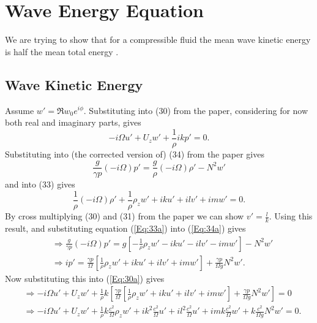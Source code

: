 \documentclass[12pt]{article}
\begin{document}
\section{Wave Energy Equation}
We are trying to show that for a compressible fluid the mean wave kinetic energy is half the mean total energy \citep[p. 476]{bretherton66}.

\subsection{Wave Kinetic Energy}

Assume $w' = \Re{w_0 e^{i\phi}}$. Substituting into (30) from the paper, considering for now both real and imaginary parts, gives
\begin{equation}
-i\Omega u' + U_z w' +\frac{1}{\rho} i k p' = 0. \label{Eq:30a}
\end{equation}
Substituting into (the corrected version of) (34) from the paper gives
\begin{equation} \frac{g}{\gamma p} (-i\Omega) p' = \frac{g}{\rho} (-i\Omega) \rho' - N^2 w' \label{Eq:34a}
\end{equation}
and into (33) gives
\begin{equation}
\frac{1}{\rho}(-i\Omega)\rho' + \frac{1}{\rho} \rho_z w' + iku'+ilv' + im w' = 0. \label{Eq:33a}
\end{equation}
By cross multiplying (30) and (31) from the paper we can show $v' = \frac{l}{k}$. Using this result, and substituting equation (\ref{Eq:33a}) into (\ref{Eq:34a}) gives
\begin{align} 
& \Rightarrow \frac{g}{\gamma p} (-i\Omega) p' = g\left[ -\frac{1}{\rho} \rho_z w' - iku' - ilv' - im w' \right] - N^2 w' \\
&\Rightarrow ip' = \frac{\gamma p}{\Omega} \left[ \frac{1}{\rho} \rho_z w' + iku' + ilv' + im w' \right] + \frac{\gamma p}{\Omega g} N^2 w'. \label{Eq:ip'}
\end{align}
Now substituting this into (\ref{Eq:30a}) gives 
\begin{align}
& \Rightarrow -i\Omega u' + U_z w' +\frac{1}{\rho} k \left[\frac{\gamma p}{\Omega} \left[ \frac{1}{\rho} \rho_z w' + iku' + ilv' + im w' \right] + \frac{\gamma p}{\Omega g} N^2 w' \right] = 0 \\
& \Rightarrow -i\Omega u' + U_z w' +\frac{1}{\rho} k\frac{c^2}{\Omega}\rho_z w' + i k^2 \frac{c^2}{\Omega}u' + i l^2 \frac{c^2}{\Omega} u' + i m k \frac{c^2}{\Omega} w' + k \frac{c^2}{\Omega g} N^2 w' = 0. 
\end{align}
\end{document}
